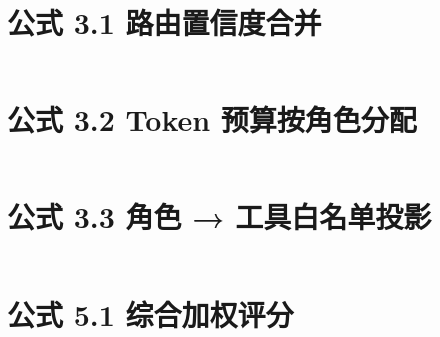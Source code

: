 \documentclass[11pt]{article}
\begin{document}
\section*{公式 3.1 路由置信度合并}
\begin{equation}

\end{equation}

\section*{公式 3.2 Token 预算按角色分配}
\begin{equation}

\end{equation}

\section*{公式 3.3 角色 → 工具白名单投影}
\begin{equation}

\end{equation}

\section*{公式 5.1 综合加权评分}
\begin{equation}

\end{equation}
\end{document}
